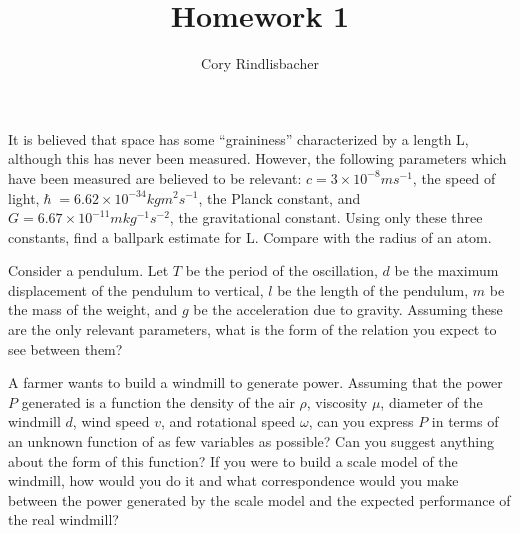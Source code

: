 \documentclass[12pt]{article}
\newenvironment{exercise}[2][Exercise]{\begin{trivlist}
\item[\hskip \labelsep {\bfseries #1}\hskip \labelsep {\bfseries #2.}]}{\end{trivlist}}
\begin{document}
 
 
 
\title{Homework 1}%
\author{Cory Rindlisbacher\\ %
} %
 
\maketitle
 
\begin{exercise}{1} %
It is believed that space has some “graininess” characterized by a length L, although this has never been measured. However, the following parameters which have been measured are believed to be relevant: $c = 3 \times 10^{− 8} m s^{− 1}$, the speed of light,$\hslash = 6.62 \times 10^{− 34} kg m^{2} s^{− 1}$, the Planck constant, and $G = 6.67 \times 10^{− 11} m kg^{− 1} s^{− 2}$, the gravitational constant. Using only these three constants, ﬁnd a ballpark estimate for L. Compare with the radius of an atom.

\end{exercise}
 
\begin{exercise}{2}
Consider a pendulum. Let $T$ be the period of the oscillation, $d$ be the maximum displacement of the pendulum to vertical, $l$ be the length of the pendulum, $m$ be the mass of the weight, and $g$ be the acceleration due to gravity. Assuming these are the only relevant parameters, what is the form of the relation you expect to see between them?
\end{exercise}

\begin{exercise}{3}
A farmer wants to build a windmill to generate power. Assuming that the power $P$
generated is a function the density of the air $\rho$, viscosity $\mu$, diameter of the windmill $d$, wind speed $v$, and rotational speed $\omega$, can you express $P$ in terms of an unknown function of as few variables as possible? Can you suggest anything about the form of this function? If you were to build a scale model of the windmill, how would you do it and what correspondence would you make between the power generated by the scale model and the expected performance of the real windmill?
\end{exercise}
\end{document}
